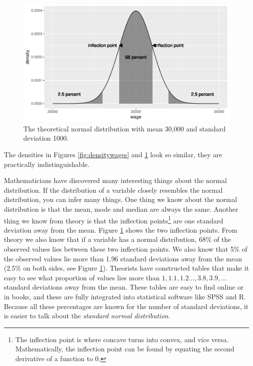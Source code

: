 \documentclass[]{book}\usepackage[]{graphicx}\usepackage[]{color}
\makeatletter
\def\maxwidth{ %
  \ifdim\Gin@nat@width>\linewidth
    \linewidth
  \else
    \Gin@nat@width
  \fi
}
\newenvironment{knitrout}{}{} %
\makeatother
\begin{document}
\begin{knitrout}
\color{fgcolor}\begin{figure}

{\centering \includegraphics[width=\maxwidth]{figure/distr_4-1} 

}

\caption[The theoretical normal distribution with mean 30,000 and standard deviation 1000]{The theoretical normal distribution with mean 30,000 and standard deviation 1000.}\label{fig:distr_4}
\end{figure}


\end{knitrout}

The densities in Figures \ref{fig:densitywages} and \ref{fig:distr_4} look so similar, they are practically indistinguishable.

Mathematicians have discovered many interesting things about the normal distribution. If the distribution of a variable closely resembles the normal distribution, you can infer many things. One thing we know about the normal distribution is that the mean, mode and median are always the same. Another thing we know from theory is that the inflection points\footnote{The inflection point is where concave turns into convex, and vice versa. Mathematically, the inflection point can be found by equating the second derivative of a function to 0.} are one standard deviation away from the mean.  Figure \ref{fig:distr_4} shows the two inflection points. From theory we also know that if a variable has a normal distribution, 68\% of the observed values lies between these two inflection points. We also know that 5\% of the observed values lie more than 1.96 standard deviations away from the mean (2.5\% on both sides, see Figure \ref{fig:distr_4}). Theorists have constructed tables that make it easy to see what proportion of values lies more than $1, 1.1, 1.2 \dots, 3.8, 3.9, \dots$ standard deviations away from the mean. These tables are easy to find online or in books, and these are fully integrated into statistical software like SPSS and R. Because all these percentages are known for the number of standard deviations, it is easier to talk about the \textit{standard normal distribution}.
\end{document}
